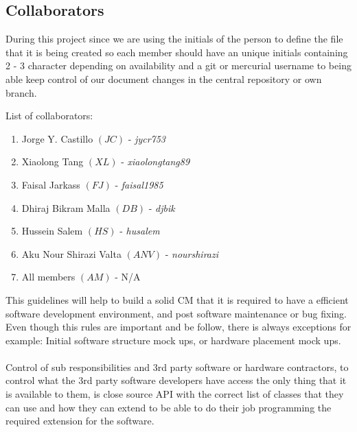 \subsection*{Collaborators}
During this project since we are using the initials of the person to define the file that it is being created so each member should have an unique initials containing 2 - 3 character depending on availability and a git or mercurial username to being able keep control of our document changes in the central repository or own branch.

List of collaborators:
\begin{enumerate}
	\item Jorge Y. Castillo $(JC)$ - \textit{jycr753}
	\item Xiaolong Tang $(XL)$ - \textit{xiaolongtang89}
	\item Faisal Jarkass $(FJ)$ - \textit{faisal1985}
	\item Dhiraj Bikram Malla $(DB)$ - \textit{djbik}
	\item Hussein Salem $(HS)$ - \textit{husalem}
	\item Aku Nour Shirazi Valta $(ANV)$ - \textit{nourshirazi}
	\item All members $(AM)$ - N/A
\end{enumerate}

This guidelines will help to build a solid CM that it is required to have a efficient software development environment, and post software maintenance or bug fixing. Even though this rules are important and be follow, there is always exceptions for example: Initial software structure mock ups, or hardware placement mock ups.
\\
\\
Control of sub responsibilities and 3rd party software or hardware contractors, to control what the 3rd party software developers have access the only thing that it is available to them, is close source API with the correct list of classes that they can use and how they can extend to be able to do their job programming the required extension for the software.
